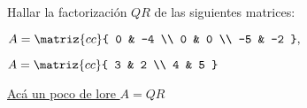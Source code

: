 \begin{enunciado}{\ejercicio}
  Hallar la factorización $QR$ de las siguientes matrices:
  \begin{center}
    \parbox{0.6\textwidth}{
      \begin{enumerate}[label=\alph*)]
        \begin{multicols}{2}
          \item $
            A =
            \matriz{cc}{
              0 & -4 \\
              0 & 0 \\
              -5 & -2
            },
          $
          \item $
            A =
            \matriz{cc}{
              3 & 2 \\
              4 & 5
            }
          $
        \end{multicols}
      \end{enumerate}
    }
  \end{center}
\end{enunciado}

\hyperlink{teoria-3:qr}{Acá un poco de lore $A = QR$  \click}

